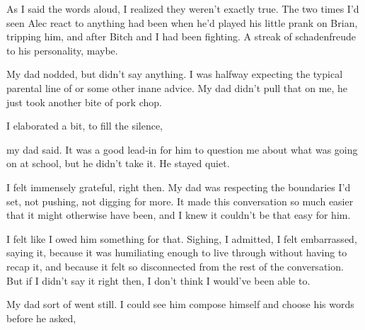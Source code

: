 
 As I said the words aloud, I realized they weren't exactly true. The two times I'd seen Alec react to anything had been when he'd played his little prank on Brian, tripping him, and after Bitch and I had been fighting. A streak of schadenfreude to his personality, maybe.



My dad nodded, but didn't say anything. I was halfway expecting the typical parental line of  or some other inane advice. My dad didn't pull that on me, he just took another bite of pork chop.

I elaborated a bit, to fill the silence, 

 my dad said. It was a good lead-in for him to question me about what was going on at school, but he didn't take it. He stayed quiet.

I felt immensely grateful, right then. My dad was respecting the boundaries I'd set, not pushing, not digging for more. It made this conversation so much easier that it might otherwise have been, and I knew it couldn't be that easy for him.

I felt like I owed him something for that. Sighing, I admitted,  I felt embarrassed, saying it, because it was humiliating enough to live through without having to recap it, and because it felt so disconnected from the rest of the conversation. But if I didn't say it right then, I don't think I would've been able to.

My dad sort of went still. I could see him compose himself and choose his words before he asked, 


